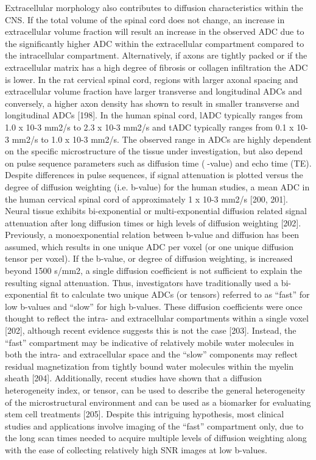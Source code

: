 Extracellular morphology also contributes to diffusion characteristics within the CNS.  If the total volume of the spinal cord does not change, an increase in extracellular volume fraction will result an increase in the observed ADC due to the significantly higher ADC within the extracellular compartment compared to the intracellular compartment.  Alternatively, if axons are tightly packed or if the extracellular matrix has a high degree of fibrosis or collagen infiltration the ADC is lower.  In the rat cervical spinal cord, regions with larger axonal spacing and extracellular volume fraction have larger transverse and longitudinal ADCs and conversely, a higher axon density has shown to result in smaller transverse and longitudinal ADCs [198]. In the human spinal cord, lADC typically ranges from 1.0 x 10-3 mm2/s to 2.3 x 10-3 mm2/s and tADC typically ranges from 0.1 x 10-3 mm2/s to 1.0 x 10-3 mm2/s. The observed range in ADCs are highly dependent on the specific microstructure of the tissue under investigation, but also depend on pulse sequence parameters such as diffusion time (-value) and echo time (TE). Despite differences in pulse sequences, if signal attenuation is plotted versus the degree of diffusion weighting (i.e. b-value) for the human studies, a mean ADC in the human cervical spinal cord of approximately 1 x 10-3 mm2/s [200, 201].
Neural tissue exhibits bi-exponential or multi-exponential diffusion related signal attenuation after long diffusion times or high levels of diffusion weighting [202].  Previously, a monoexponential relation between b-value and diffusion has been assumed, which results in one unique ADC per voxel (or one unique diffusion tensor per voxel).  If the b-value, or degree of diffusion weighting, is increased beyond 1500 s/mm2, a single diffusion coefficient is not sufficient to explain the resulting signal attenuation.  Thus, investigators have traditionally used a bi-exponential fit to calculate two unique ADCs (or tensors) referred to as “fast” for low b-values and “slow” for high b-values.  These diffusion coefficients were once thought to reflect the intra- and extracellular compartments within a single voxel [202], although recent evidence suggests this is not the case [203].  Instead, the “fast” compartment may be indicative of relatively mobile water molecules in both the intra- and extracellular space and the “slow” components may reflect residual magnetization from tightly bound water molecules within the myelin sheath [204].  Additionally, recent studies have shown that a diffusion heterogeneity index, or tensor, can be used to describe the general heterogeneity of the microstructural environment and can be used as a biomarker for evaluating stem cell treatments [205]. Despite this intriguing hypothesis, most clinical studies and applications involve imaging of the “fast” compartment only, due to the long scan times needed to acquire multiple levels of diffusion weighting along with the ease of collecting relatively high SNR images at low b-values. 


